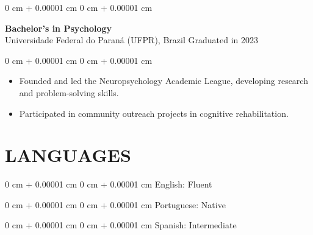 \documentclass[10pt, letterpaper]{article}
\newenvironment{highlights}{
    \begin{itemize}[
        topsep=0.10 cm,
        parsep=0.10 cm,
        partopsep=0pt,
        itemsep=0pt,
        leftmargin=0 cm + 10pt
    ]
}{
    \end{itemize}
}
\newenvironment{onecolentry}{
    \begin{adjustwidth}{
        0 cm + 0.00001 cm
    }{
        0 cm + 0.00001 cm
    }
}{
    \end{adjustwidth}
}
\begin{document}
\vspace{0.2cm}

\begin{onecolentry}
    \setcolumnwidth{\fill, 4.5cm}
    \begin{paracol}{2}
        \textbf{Bachelor’s in Psychology} \\ Universidade Federal do Paraná (UFPR), Brazil
        \switchcolumn
        \raggedleft Graduated in 2023
    \end{paracol}
\end{onecolentry}
\vspace{0.10cm}
\begin{onecolentry}
    \begin{highlights}
                \item Founded and led the Neuropsychology Academic League, developing research and problem-solving skills.
                \item Participated in community outreach projects in cognitive rehabilitation.
    \end{highlights}
\end{onecolentry}

\section{LANGUAGES}
\begin{onecolentry}{English: Fluent}\end{onecolentry}
\vspace{0.2cm}
\begin{onecolentry}{Portuguese: Native}\end{onecolentry}
\vspace{0.2cm}
\begin{onecolentry}{Spanish: Intermediate}\end{onecolentry}
\end{document}
